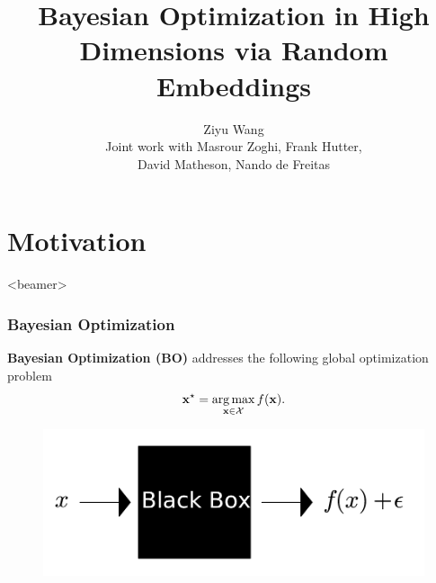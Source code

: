 \documentclass[grey]{beamer}
\title{Bayesian Optimization in High Dimensions via Random Embeddings}
\author[Ziyu Wang]{Ziyu Wang\\ [3mm]Joint work with Masrour Zoghi, Frank Hutter, \\
David Matheson, Nando de Freitas}
\date{}                    %
\DeclareMathOperator*{\argmax}{arg\,max}
\begin{document}
\begin{frame}
  \titlepage
\end{frame}

\section[Outline]{}

\begin{frame}
  \tableofcontents
\end{frame}


\section{Motivation}
\label{sec:ahmc}
\begin{frame}<beamer>
 \tableofcontents[currentsection]
\end{frame}

\begin{frame}
 \frametitle{Bayesian Optimization}
 {\bf \textcolor{myColor}{Bayesian Optimization (BO)}}
 addresses the following global optimization problem
 \[ \vx^{\star} = \argmax_{\vx \in {\cal X}} f(\vx). \]
 
 \begin{figure}
   \centering
   \includegraphics[width=0.75\columnwidth]
   {./figs/blackbox}
   \label{fig:traj}
  \end{figure}
\end{frame}
\end{document}
